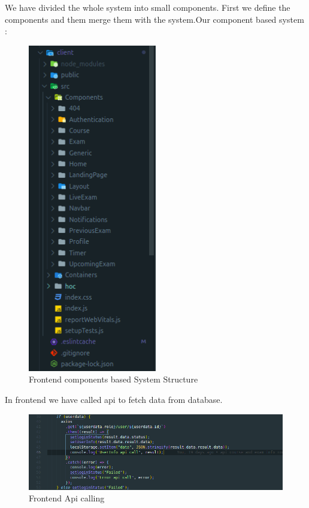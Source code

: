 \documentclass[10pt]{article}
\begin{document}
We have divided the whole system into small components. First we define the components and them merge them with the system.Our component based system :

\begin{figure}[H]
  \centering
  \centerline{\includegraphics[width=0.5\textwidth]{frontend-components.png}}
  \caption{Frontend components based System Structure}
  \label{fig}
\end{figure}

In frontend we have called api to fetch data from database.

\begin{figure}[H]
  \centering
  \centerline{\includegraphics[width=\textwidth]{api-call2.png}}
  \caption{Frontend Api calling}
  \label{fig}
\end{figure}
\end{document}
